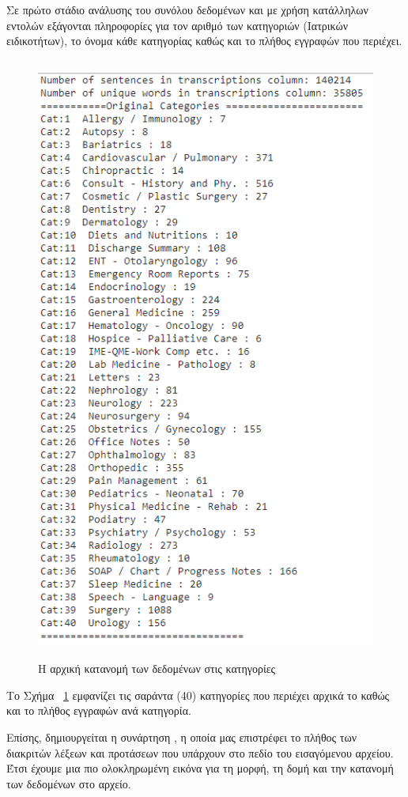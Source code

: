 Σε πρώτο στάδιο ανάλυσης του συνόλου δεδομένων και με χρήση κατάλληλων εντολών  εξάγονται πληροφορίες για τον αριθμό των κατηγοριών (Ιατρικών ειδικοτήτων), το όνομα κάθε κατηγορίας καθώς και το πλήθος εγγραφών που περιέχει.

\begin{figure} [ht!]
\centering
\includegraphics[width=\textwidth,height=20cm,keepaspectratio]{pictures/3categories.png} \caption{Η αρχική κατανομή των δεδομένων στις κατηγορίες}\label{figure3.2}
\end{figure}

Το Σχήμα~ \ref{figure3.2} εμφανίζει τις σαράντα (40) κατηγορίες που περιέχει αρχικά το  καθώς και το πλήθος εγγραφών ανά κατηγορία.

Επίσης, δημιουργείται η συνάρτηση , η οποία μας επιστρέφει το πλήθος των διακριτών λέξεων και προτάσεων που υπάρχουν στο πεδίο  του εισαγόμενου αρχείου.
Έτσι έχουμε μια πιο ολοκληρωμένη εικόνα για τη μορφή, τη δομή και την κατανομή των δεδομένων στο αρχείο.

